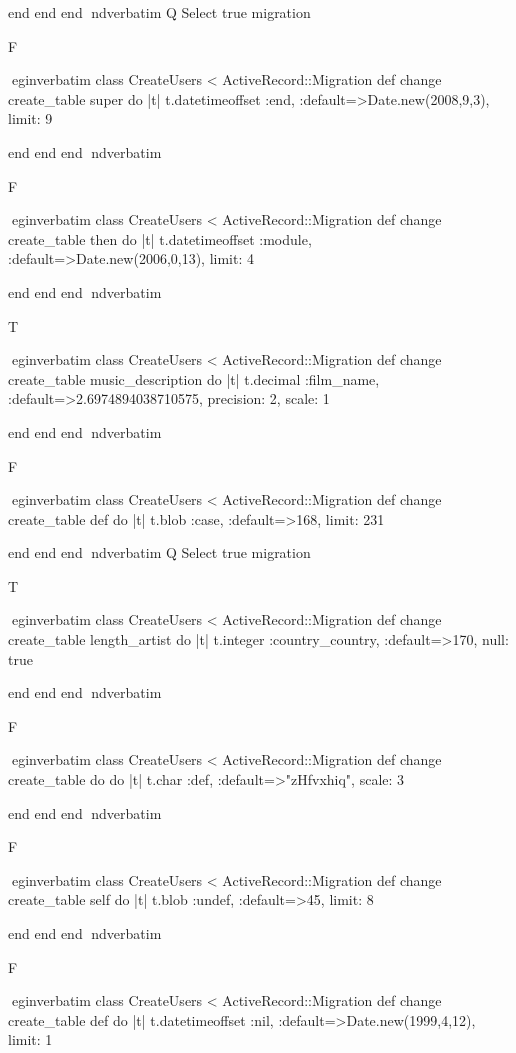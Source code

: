     end 
  end 
end
nd{verbatim}
Q
 Select true migration

F

egin{verbatim}
 class CreateUsers < ActiveRecord::Migration 
  def change 
    create_table super do |t| 
      t.datetimeoffset :end, :default=>Date.new(2008,9,3), limit: 9
    
    end 
  end 
end
nd{verbatim}

F

egin{verbatim}
 class CreateUsers < ActiveRecord::Migration 
  def change 
    create_table then do |t| 
      t.datetimeoffset :module, :default=>Date.new(2006,0,13), limit: 4
    
    end 
  end 
end
nd{verbatim}

T

egin{verbatim}
 class CreateUsers < ActiveRecord::Migration 
  def change 
    create_table music_description do |t| 
      t.decimal :film_name, :default=>2.6974894038710575, precision: 2, scale: 1
    
    end 
  end 
end
nd{verbatim}

F

egin{verbatim}
 class CreateUsers < ActiveRecord::Migration 
  def change 
    create_table def do |t| 
      t.blob :case, :default=>168, limit: 231
    
    end 
  end 
end
nd{verbatim}
Q
 Select true migration

T

egin{verbatim}
 class CreateUsers < ActiveRecord::Migration 
  def change 
    create_table length_artist do |t| 
      t.integer :country_country, :default=>170, null: true
    
    end 
  end 
end
nd{verbatim}

F

egin{verbatim}
 class CreateUsers < ActiveRecord::Migration 
  def change 
    create_table do do |t| 
      t.char :def, :default=>"zHfvxhiq", scale: 3
    
    end 
  end 
end
nd{verbatim}

F

egin{verbatim}
 class CreateUsers < ActiveRecord::Migration 
  def change 
    create_table self do |t| 
      t.blob :undef, :default=>45, limit: 8
    
    end 
  end 
end
nd{verbatim}

F

egin{verbatim}
 class CreateUsers < ActiveRecord::Migration 
  def change 
    create_table def do |t| 
      t.datetimeoffset :nil, :default=>Date.new(1999,4,12), limit: 1
    

